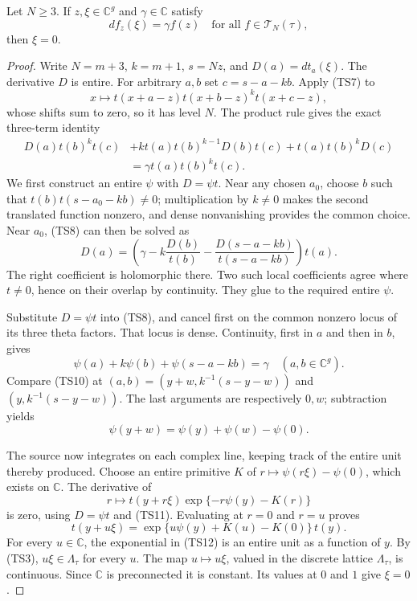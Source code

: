 \begin{proposition}
\label{prop:ftb-torus-theta-tangent-separation}
Let \(N\ge3\).
If \(z,\xi\in\mathbb C^g\) and \(\gamma\in\mathbb C\)
satisfy
\[
       d f_z(\xi)=\gamma f(z)
                         \quad\text{for all }f\in\mathcal T_N(\tau),
                                                               \tag{TS7}
\]
then \(\xi=0\).
\end{proposition}
\begin{proof}
Write \(N=m+3\), \(k=m+1\), \(s=Nz\), and
\(D(a)=d t_a(\xi)\).
The derivative \(D\) is entire.
For arbitrary \(a,b\) set \(c=s-a-kb\).
Apply (TS7) to
\[
 x\longmapsto
 t(x+a-z)t(x+b-z)^k t(x+c-z),
\]
whose shifts sum to zero, so it has level \(N\).
The product rule gives the exact three-term identity
\[
 \begin{split}
 D(a)t(b)^kt(c)
 &+kt(a)t(b)^{k-1}D(b)t(c)
       +t(a)t(b)^kD(c)\\
                         &=\gamma t(a)t(b)^kt(c).        \tag{TS8}
 \end{split}
\]
We first construct an entire \(\psi\) with \(D=\psi t\).
Near any chosen \(a_0\), choose \(b\) such that
\(t(b)t(s-a_0-kb)\ne0\); multiplication by \(k\ne0\)
makes the second translated function nonzero, and dense
nonvanishing provides the common choice.
Near \(a_0\), (TS8) can then be solved as
\[
 D(a)=
 \left(\gamma-k\frac{D(b)}{t(b)}
              -\frac{D(s-a-kb)}{t(s-a-kb)}\right)t(a).
 \tag{TS9}
\]
The right coefficient is holomorphic there.
Two such local coefficients agree where \(t\ne0\),
hence on their overlap by continuity.
They glue to the required entire \(\psi\).

Substitute \(D=\psi t\) into (TS8), and cancel first on
the common nonzero locus of its three theta factors.
That locus is dense.  Continuity, first in \(a\) and then
in \(b\), gives
\[
                 \psi(a)+k\psi(b)+\psi(s-a-kb)=\gamma
                                             \quad(a,b\in\mathbb C^g).
 \tag{TS10}
\]
Compare (TS10) at
\((a,b)=(y+w,k^{-1}(s-y-w))\) and
\((y,k^{-1}(s-y-w))\).
The last arguments are respectively \(0,w\); subtraction
yields
\[
                  \psi(y+w)=\psi(y)+\psi(w)-\psi(0).      \tag{TS11}
\]

The source now integrates on each complex line, keeping
track of the entire unit thereby produced.
Choose an entire primitive \(K\) of
\(r\mapsto\psi(r\xi)-\psi(0)\), which exists on \(\mathbb C\).
The derivative of
\[
 r\longmapsto
       t(y+r\xi)\exp\{-r\psi(y)-K(r)\}
\]
is zero, using \(D=\psi t\) and (TS11).
Evaluating at \(r=0\) and \(r=u\) proves
\[
 t(y+u\xi)=
    \exp\{u\psi(y)+K(u)-K(0)\}\,t(y).                    \tag{TS12}
\]
For every \(u\in\mathbb C\), the exponential in (TS12)
is an entire unit as a function of \(y\).
By (TS3), \(u\xi\in\Lambda_\tau\) for every \(u\).
The map \(u\mapsto u\xi\), valued in the discrete lattice
\(\Lambda_\tau\), is continuous.
Since \(\mathbb C\) is preconnected it is constant.
Its values at \(0\) and \(1\) give \(\xi=0\).
\end{proof}

